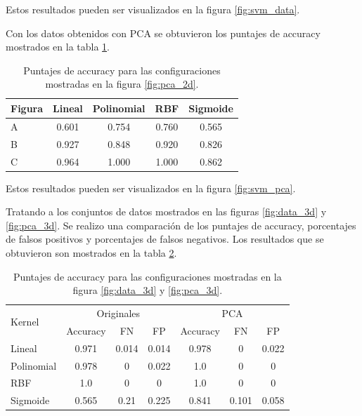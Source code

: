 Estos resultados pueden ser visualizados en la figura \ref{fig:svm_data}.

Con los datos obtenidos con PCA se obtuvieron los puntajes de accuracy mostrados en la tabla \ref{table:pca_2d}.

\begin{table}[H]
    \centering
    \begin{tabular}{lcccc} \hline
        Figura & Lineal & Polinomial & RBF   & Sigmoide \\ \hline
        A      & 0.601  & 0.754      & 0.760 & 0.565    \\
        B      & 0.927  & 0.848      & 0.920 & 0.826    \\
        C      & 0.964  & 1.000      & 1.000 & 0.862    \\ \hline
    \end{tabular}
    \caption{Puntajes de accuracy para las configuraciones mostradas en la figura \ref{fig:pca_2d}.}
    \label{table:pca_2d}
\end{table}

Estos resultados pueden ser visualizados en la figura \ref{fig:svm_pca}.

Tratando a los conjuntos de datos mostrados en las figuras \ref{fig:data_3d} y \ref{fig:pca_3d}. Se realizo una comparación de los puntajes de accuracy, porcentajes de falsos positivos y porcentajes de falsos negativos. Los resultados que se obtuvieron son mostrados en la tabla \ref{table:results_3d}.

\begin{table}[H]
    \centering
    \begin{tabular}{l|ccc|ccc} \hline
        \multirow{2}{*}{Kernel} & \multicolumn{3}{c}{Originales} & \multicolumn{3}{|c}{PCA}                                    \\ \cline{2-7}
                                & Accuracy                       & FN                       & FP    & Accuracy & FN    & FP    \\ \hline
        Lineal                  & 0.971                          & 0.014                    & 0.014 & 0.978    & 0     & 0.022 \\
        Polinomial              & 0.978                          & 0                        & 0.022 & 1.0      & 0     & 0     \\
        RBF                     & 1.0                            & 0                        & 0     & 1.0      & 0     & 0     \\
        Sigmoide                & 0.565                          & 0.21                     & 0.225 & 0.841    & 0.101 & 0.058 \\ \hline
    \end{tabular}
    \caption{Puntajes de accuracy para las configuraciones mostradas en la figura \ref{fig:data_3d} y \ref{fig:pca_3d}.}
    \label{table:results_3d}
\end{table}


